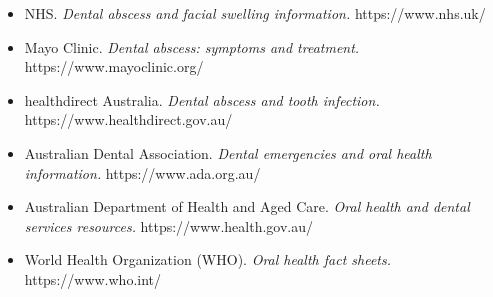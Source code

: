 \begin{itemize}
    \item NHS. \textit{Dental abscess and facial swelling information.} https://www.nhs.uk/
    \item Mayo Clinic. \textit{Dental abscess: symptoms and treatment.} https://www.mayoclinic.org/
    \item healthdirect Australia. \textit{Dental abscess and tooth infection.} https://www.healthdirect.gov.au/
    \item Australian Dental Association. \textit{Dental emergencies and oral health information.} https://www.ada.org.au/
    \item Australian Department of Health and Aged Care. \textit{Oral health and dental services resources.} https://www.health.gov.au/
    \item World Health Organization (WHO). \textit{Oral health fact sheets.} https://www.who.int/
\end{itemize}

\clearpage

